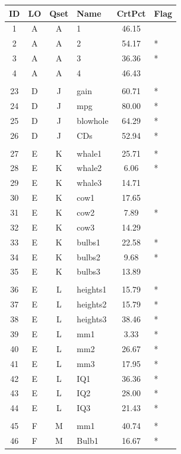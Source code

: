 \documentclass[12pt,nohyper]{tufte-handout}\usepackage[]{graphicx}\usepackage[]{color}
\begin{document}
\begin{longtable}{ccclcl}
  \hline
ID & LO & Qset & Name & CrtPct & Flag \\ 
  \hline
  1 & A & A & 1 & 46.15 &  \\ 
    2 & A & A & 2 & 54.17 & * \\ 
    3 & A & A & 3 & 36.36 & * \\ 
    4 & A & A & 4 & 46.43 &  \\ 
   &  &  &  &  &  \\ 
   23 & D & J & gain & 60.71 & * \\ 
   24 & D & J & mpg & 80.00 & * \\ 
   25 & D & J & blowhole & 64.29 & * \\ 
   26 & D & J & CDs & 52.94 & * \\ 
   &  &  &  &  &  \\ 
   27 & E & K & whale1 & 25.71 & * \\ 
   28 & E & K & whale2 & 6.06 & * \\ 
   29 & E & K & whale3 & 14.71 &  \\ 
   30 & E & K & cow1 & 17.65 &  \\ 
   31 & E & K & cow2 & 7.89 & * \\ 
   32 & E & K & cow3 & 14.29 &  \\ 
   33 & E & K & bulbs1 & 22.58 & * \\ 
   34 & E & K & bulbs2 & 9.68 & * \\ 
   35 & E & K & bulbs3 & 13.89 &  \\ 
   &  &  &  &  &  \\ 
   36 & E & L & heights1 & 15.79 & * \\ 
   37 & E & L & heights2 & 15.79 & * \\ 
   38 & E & L & heights3 & 38.46 & * \\ 
   39 & E & L & mm1 & 3.33 & * \\ 
   40 & E & L & mm2 & 26.67 & * \\ 
   41 & E & L & mm3 & 17.95 & * \\ 
   42 & E & L & IQ1 & 36.36 & * \\ 
   43 & E & L & IQ2 & 28.00 & * \\ 
   44 & E & L & IQ3 & 21.43 & * \\ 
   &  &  &  &  &  \\ 
   45 & F & M & mm1 & 40.74 & * \\ 
   46 & F & M & Bulb1 & 16.67 & * \\ 

\end{longtable}
\end{document}
